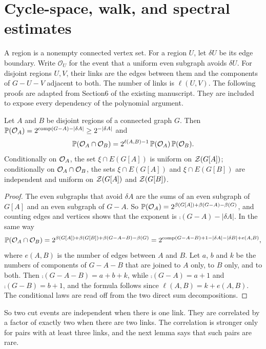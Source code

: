 \section{Cycle-space, walk, and spectral estimates}
\label{sec:polynomial-foundations}

A region is a nonempty connected vertex set.
For a region $U$, let $\delta U$ be its edge boundary.
Write $\mathcal O_U$ for the event that a uniform even subgraph avoids $\delta U$.
For disjoint regions $U,V$, their links are the edges between them and the components of $G-U-V$ adjacent to both.
The number of links is $\ell(U,V)$.
The following proofs are adapted from Section6 of the existing manuscript.
They are included to expose every dependency of the polynomial argument.

\begin{lemma}\label{lem:link}
Let $A$ and $B$ be disjoint regions of a connected graph $G$. Then
$\mathbb P(\mathcal O_A)=2^{\operatorname{comp}(G-A)-|\delta A|}\ge2^{-|\delta A|}$ and
\[
  \mathbb P(\mathcal O_A\cap\mathcal O_B)=2^{\ell(A,B)-1}\,\mathbb P(\mathcal O_A)\,\mathbb P(\mathcal O_B).
\]
Conditionally on $\mathcal O_A$, the set $\xi\cap E(G[A])$ is uniform on $\mathcal Z(G[A])$; conditionally on
$\mathcal O_A\cap\mathcal O_B$, the sets $\xi\cap E(G[A])$ and $\xi\cap E(G[B])$ are independent and uniform on
$\mathcal Z(G[A])$ and $\mathcal Z(G[B])$.
\end{lemma}

\begin{proof}
The even subgraphs that avoid $\delta A$ are the sums of an even subgraph of $G[A]$ and an even
subgraph of $G-A$. So $\mathbb P(\mathcal O_A)=2^{\beta(G[A])+\beta(G-A)-\beta(G)}$, and counting edges and
vertices shows that the exponent is $\comp(G-A)-|\delta A|$. In the same way
\[
  \mathbb P(\mathcal O_A\cap\mathcal O_B)=2^{\beta(G[A])+\beta(G[B])+\beta(G-A-B)-\beta(G)}
     =2^{\operatorname{comp}(G-A-B)+1-|\delta A|-|\delta B|+e(A,B)},
\]
where $e(A,B)$ is the number of edges between $A$ and $B$. Let $a$, $b$ and $k$ be the numbers of
components of $G-A-B$ that are joined to $A$ only, to $B$ only, and to both. Then
$\comp(G-A-B)=a+b+k$, while $\comp(G-A)=a+1$ and $\comp(G-B)=b+1$, and the formula follows since
$\ell(A,B)=k+e(A,B)$. The conditional laws are read off from the two direct sum decompositions.
\end{proof}

So two cut events are independent when there is one link. They are correlated by a factor of
exactly two when there are two links. The correlation is stronger only for pairs with at least
three links, and the next lemma says that such pairs are rare.

